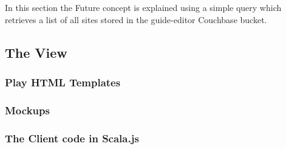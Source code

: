 In this section the Future concept is explained using a simple query which retrieves a list of all sites stored in the guide-editor Couchbase bucket.


\subsection{The View}

\subsubsection{Play HTML Templates}

\subsubsection{Mockups}

\subsubsection{The Client code in Scala.js}



